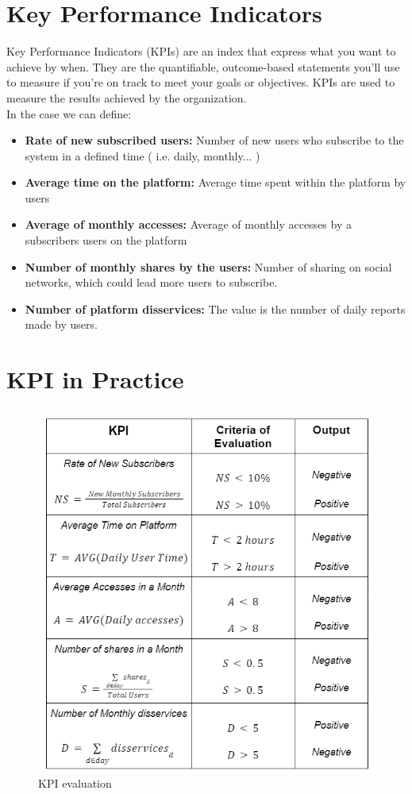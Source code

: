 \documentclass[a4paper,12pt]{report}
\begin{document}
\section{Key Performance Indicators}
Key Performance Indicators (KPIs) are an index that express what you want to
achieve by when. They are the quantifiable, outcome-based statements you’ll use to measure if
you’re on track to meet your goals or objectives.
KPIs are used to measure the results achieved by the organization.\\ In the case we can define:
\begin{itemize}
\item{\textbf{Rate of new subscribed users:} Number of new users who subscribe to the system in a defined time ( i.e. daily, monthly... ) }
\item{\textbf{Average time on the platform:} Average time spent within the platform by users  }
\item{\textbf{Average of monthly accesses:} Average of monthly accesses by a subscribers users on the platform  }
\item{\textbf{Number of monthly shares by the users:} Number of sharing on social networks, which could lead more users to subscribe.}
\item{\textbf{Number of platform disservices:} The value is the number of daily reports made by users.}

\end{itemize}

\section{KPI in Practice}

\begin{figure}[H]
 \centering
\includegraphics[scale=0.8]{KPI}
\caption{KPI evaluation}
\label{KPi }
\end{figure} 
\end{document}
